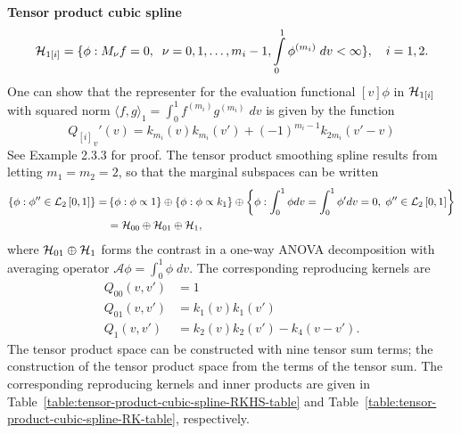\begin{example}{\textbf {Tensor product cubic spline}}
\[
\mathcal{H}_{1\left[i\right]} = \lbrace \phi: M_\nu f = 0,\;\; \nu = 0,1,\dots, m_i-1,\int\limits_{0}^1 \phi^{\left(m_i\right)}\;dv < \infty \rbrace, \quad i = 1,2.
\]
One can show that the representer for the evaluation functional $\left[v\right] \phi$ in $\mathcal{H}_{1\left[i\right]}$ with squared norm $\langle f,g\rangle_1= \int_0^1 f^{\left(m_i\right)}g^{\left(m_i\right)}\;dv$ is given by the function
\begin{equation}
{Q_{\left[i\right]} }_v'\left(v\right) = k_{m_i}\left(v\right)k_{m_i}\left(v'\right) + \left(-1\right)^{m_i-1}k_{2m_i}\left(v' - v\right)
\end{equation}
\noindent
See \cite{gu2002smoothing} Example 2.3.3 for proof. The tensor product smoothing spline results from letting $m_1 = m_2 = 2$, so that the marginal subspaces can be written
\begin{align*} %
\left\{ \phi: \phi'' \in \mathcal{L}_2\left[0,1\right] \right\} = &\left\{ \phi: \phi \propto 1 \right\} \oplus  \left\{ \phi: \phi \propto k_1 \right\} \oplus \left\{ \phi: \int_0^1 \phi dv = \int_0^1 \phi' dv = 0,\; \phi'' \in \mathcal{L}_2\left[0,1\right]  \right\} \\
&= \hilbert_{00} \oplus \hilbert_{01} \oplus \hilbert_1,
\end{align*}
\noindent
where $ \mathcal{H}_{01} \oplus \mathcal{H}_1$ forms the contrast in a one-way ANOVA decomposition with averaging operator $\mathcal{A}\phi = \int_0^1 \phi\;dv$. The corresponding reproducing kernels are
\begin{align*}%
Q_{00}\left(v,v'\right) &= 1\\
Q_{01}\left(v,v'\right) &= k_1\left(v\right)k_1\left(v'\right)\\
Q_{1}\left(v,v'\right) &= k_2\left(v\right)k_2\left(v'\right) - k_4\left(v-v'\right).
\end{align*}
\noindent
The tensor product space can be constructed with nine tensor sum terms; the construction of the tensor product space from the terms of the tensor sum. The corresponding reproducing kernels and inner products are given in Table~\ref{table:tensor-product-cubic-spline-RKHS-table} and Table~\ref{table:tensor-product-cubic-spline-RK-table}, respectively.


\end{example}
